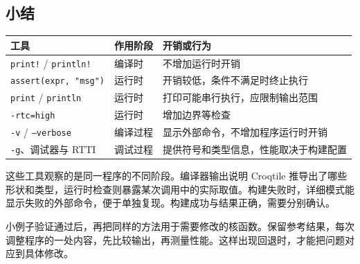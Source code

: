 \subsection*{小结}

\begin{table}[htbp]\centering\small
\begin{tabularx}{\linewidth}{@{}lXX@{}}
\toprule
\textbf{工具} & \textbf{作用阶段} & \textbf{开销或行为} \\
\midrule
\texttt{print!} / \texttt{println!} & 编译时 & 不增加运行时开销 \\
\texttt{assert(expr, "msg")} & 运行时 & 开销较低，条件不满足时终止执行 \\
\texttt{print} / \texttt{println} & 运行时 & 打印可能串行执行，应限制输出范围 \\
\texttt{-rtc=high} & 运行时 & 增加边界等检查 \\
\texttt{-v} / \texttt{--verbose} & 编译过程 & 显示外部命令，不增加程序运行时开销 \\
\texttt{-g}、调试器与 RTTI & 调试过程 & 提供符号和类型信息，性能取决于构建配置 \\
\bottomrule
\end{tabularx}
\end{table}

这些工具观察的是同一程序的不同阶段。编译器输出说明 Croqtile 推导出了哪些形状和类型，运行时检查则暴露某次调用中的实际取值。构建失败时，详细模式能显示失败的外部命令，便于单独复现。构建成功与结果正确，需要分别确认。

小例子验证通过后，再把同样的方法用于需要修改的核函数。保留参考结果，每次调整程序的一处内容，先比较输出，再测量性能。这样出现回退时，才能把问题对应到具体修改。
